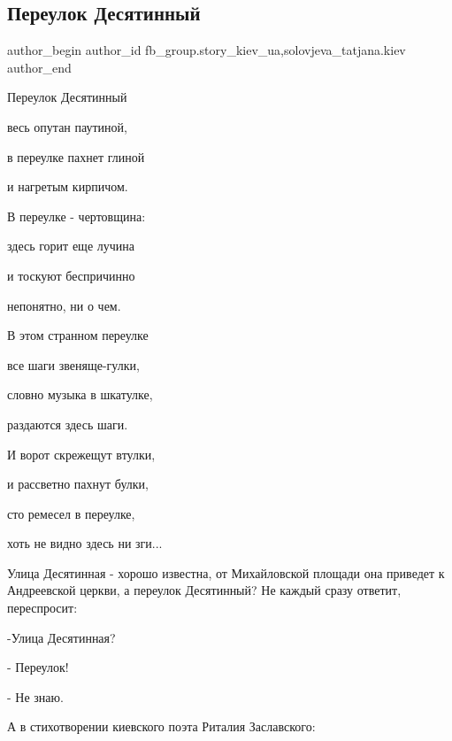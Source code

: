 
 
 
 
 

\subsection{Переулок Десятинный}
\label{sec:02_07_2023.fb.fb_group.story_kiev_ua.1.pereulok_desjatinnyj}
 
\ifcmt
 author_begin
   author_id fb_group.story_kiev_ua,solovjeva_tatjana.kiev
 author_end
\fi

Переулок Десятинный\par
весь опутан паутиной,\par
в переулке пахнет глиной\par
и нагретым кирпичом.\par
В переулке - чертовщина:\par
здесь горит еще лучина\par
и тоскуют беспричинно\par
непонятно, ни о чем.\par

В этом странном переулке\par
все шаги звеняще-гулки,\par
словно музыка в шкатулке,\par
раздаются здесь шаги.\par
И ворот скрежещут втулки,\par
и рассветно пахнут булки,\par
сто ремесел в переулке,\par
хоть не видно здесь ни зги...\par

Улица Десятинная - хорошо известна, от Михайловской площади она приведет к Андреевской церкви, а переулок Десятинный? Не каждый сразу ответит, переспросит: \par
-Улица Десятинная? \par
- Переулок! \par
- Не знаю.\par
 А в стихотворении киевского поэта Риталия Заславского:\par

